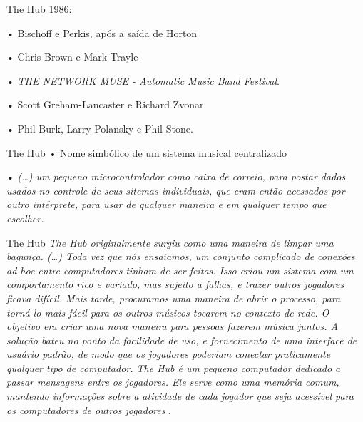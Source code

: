 \documentclass[aspectratio=169]{beamer}
\begin{document}
\begin{frame}{The Hub}
1986:

• Bischoff e Perkis, após a saída de Horton

• Chris Brown e Mark Trayle

• \emph{THE NETWORK MUSE - Automatic Music Band Festival}. 

• Scott Greham-Lancaster e Richard Zvonar 

• Phil Burk, Larry Polansky e Phil Stone.
\end{frame}

\begin{frame}{The Hub}
• Nome simbólico de um sistema musical centralizado

• \emph{(\ldots) um pequeno microcontrolador como caixa de correio, para postar dados usados no controle de seus sitemas individuais, que eram então acessados por outro intérprete, para usar de qualquer maneira e em qualquer tempo que escolher.}
\end{frame}

\begin{frame}{The Hub}
\emph{\emph{The Hub} originalmente surgiu como uma maneira de limpar uma bagunça. (\ldots) Toda vez que nós ensaiamos, um conjunto complicado de conexões \emph{ad-hoc} entre computadores tinham de ser feitas. Isso criou um sistema com um comportamento rico e variado, mas sujeito a falhas, e trazer outros jogadores ficava difícil. Mais tarde, procuramos uma maneira de abrir o processo, para torná-lo mais fácil para os outros músicos tocarem no contexto de rede. O objetivo era criar uma nova maneira para pessoas fazerem música juntos. A solução bateu no ponto da facilidade de uso, e fornecimento de uma interface de usuário padrão, de modo que os jogadores poderiam conectar praticamente qualquer tipo de computador. \emph{The Hub} é um pequeno computador dedicado a passar mensagens entre os jogadores. Ele serve como uma memória comum, mantendo informações sobre a atividade de cada jogador que seja acessível para os computadores de outros jogadores} \cite[seção 2.1]{brown_indigenous_2013}. 
\end{frame}
\end{document}
